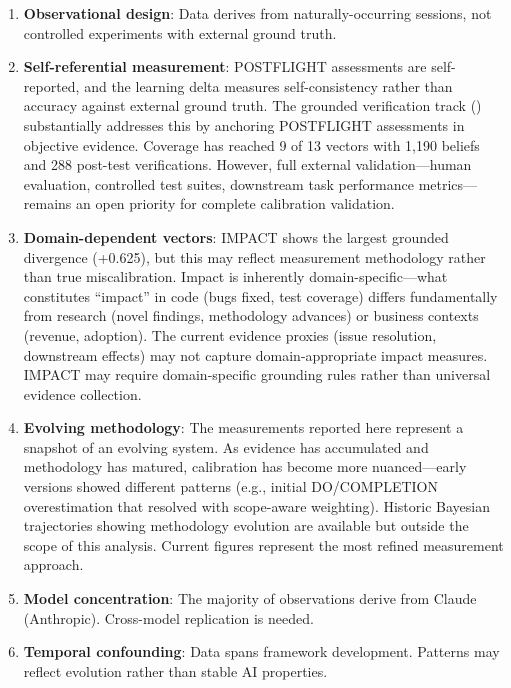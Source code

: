 \begin{enumerate}
    \item \textbf{Observational design}: Data derives from naturally-occurring sessions, not controlled experiments with external ground truth.

    \item \textbf{Self-referential measurement}: POSTFLIGHT assessments are self-reported, and the learning delta measures self-consistency rather than accuracy against external ground truth. The grounded verification track () substantially addresses this by anchoring POSTFLIGHT assessments in objective evidence. Coverage has reached 9 of 13 vectors with 1,190 beliefs and 288 post-test verifications. However, full external validation---human evaluation, controlled test suites, downstream task performance metrics---remains an open priority for complete calibration validation.

    \item \textbf{Domain-dependent vectors}: IMPACT shows the largest grounded divergence (+0.625), but this may reflect measurement methodology rather than true miscalibration. Impact is inherently domain-specific---what constitutes ``impact'' in code (bugs fixed, test coverage) differs fundamentally from research (novel findings, methodology advances) or business contexts (revenue, adoption). The current evidence proxies (issue resolution, downstream effects) may not capture domain-appropriate impact measures. IMPACT may require domain-specific grounding rules rather than universal evidence collection.

    \item \textbf{Evolving methodology}: The measurements reported here represent a snapshot of an evolving system. As evidence has accumulated and methodology has matured, calibration has become more nuanced---early versions showed different patterns (e.g., initial DO/COMPLETION overestimation that resolved with scope-aware weighting). Historic Bayesian trajectories showing methodology evolution are available but outside the scope of this analysis. Current figures represent the most refined measurement approach.

    \item \textbf{Model concentration}: The majority of observations derive from Claude (Anthropic). Cross-model replication is needed.

    \item \textbf{Temporal confounding}: Data spans framework development. Patterns may reflect evolution rather than stable AI properties.


\end{enumerate}
